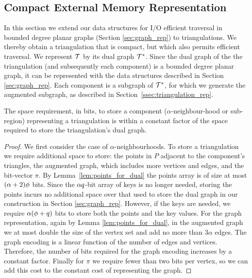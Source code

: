 {%
\subsection{Compact External Memory Representation}
\label{ssec:compact_tin_external}

In this section we extend our data structures for I/O efficient traversal in 
bounded degree planar graphs (Section \ref{sec:graph_rep}) to triangulations. 
We thereby obtain a triangulation that is compact, but which also 
permits efficient traversal. 
We represent $\mathcal{T}$ by its dual graph $\mathcal{T}^*$. 
Since the dual graph of the the triangulation (and subsequently each component) is a 
bounded degree planar graph, it can be represented with the data structures 
described in Section \ref{sec:graph_rep}. 
Each component is a subgraph of $\mathcal{T}^*$, for which we generate the 
augmented subgraph, as described in Section~\ref{ssec:triangulation_rep}.

\begin{lemma}\label{lem:terrain_components}
The space requirement, in bits, to store a component ($\alpha$-neighbour-hood
 or sub-region) representing a triangulation is within a constant factor of the 
space required to store the triangulation's dual graph. 
\end{lemma}

\begin{proof}
We first consider the case of $\alpha$-neighbourhoods. 
To store a triangulation we require additional space to store: the points in $P$ 
adjacent to the component's triangles, the augmented 
graph, which includes more vertices and edges, and the bit-vector $\pi$. 
By Lemma~\ref{lem:points_for_dual} the points array is of size at most 
$(\alpha + 2)\phi$ bits. 
Since the $\alpha q$-bit array of keys is no longer needed, storing the 
points incurs no additional space over that used to store the dual graph 
in our construction in Section \ref{sec:graph_rep}. 
However, if the keys are needed, we require 
$\alpha (\phi + q)$ bits to 
store both the points and the key values.  
For the graph representation, again by Lemma \ref{lem:points_for_dual}, in 
the augmented graph we at most double the size of the vertex set and add 
no more than $3 \alpha$ edges. 
The graph encoding is a linear function of the number of edges and 
vertices. 
Therefore, the number of bits required for the graph encoding 
increases by a constant factor. 
Finally for $\pi$ we require fewer than two bits per vertex, so we can add 
this cost to the constant cost of representing the graph.


\end{proof}}
